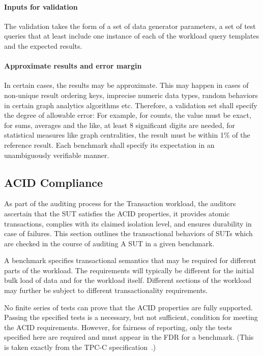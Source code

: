 \paragraph{Inputs for validation}
The validation takes the form of a set of data generator parameters, a set of test queries that at least include one instance of each of the workload query templates and the expected results.

\paragraph{Approximate results and error margin}
In certain cases, the results may be approximate. This may happen in cases of non-unique result ordering keys, imprecise numeric data types, random behaviors in certain graph analytics algorithms etc. Therefore, a validation set shall specify the degree of allowable error: For example, for counts, the value must be exact, for sums, averages and the like, at least 8 significant digits are needed, for statistical measures like graph centralities, the result must be within 1\% of the reference result. Each benchmark shall specify its expectation in an unambiguously verifiable manner.

\subsection{ACID Compliance}
\label{sec:acid-compliance}

As part of the auditing process for the Transaction workload, the auditors ascertain that the SUT satisfies the ACID properties,
\ie it provides atomic transactions, complies with its claimed isolation level, and ensures durability in case of failures.
This section outlines the transactional behaviors of SUTs which are checked in the course of auditing A SUT in a given benchmark.

A benchmark specifies transactional semantics that may be required for different parts of the workload. The requirements will typically be different for the initial bulk load of data and for the workload itself. Different sections of the workload may further be subject to different transactionality requirements.

No finite series of tests can prove that the ACID properties are fully supported. Passing the specified tests is a necessary, but not sufficient, condition for meeting the ACID requirements. However, for fairness of reporting, only the tests specified here are required and must appear in the FDR for a benchmark. (This is taken exactly from the \mbox{TPC-C} specification~\cite{tpcc}.)

